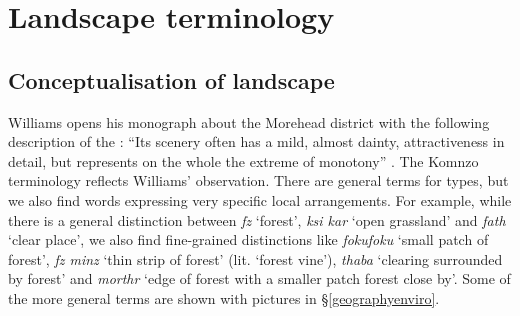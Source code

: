 \section{Landscape terminology}\label{landscapeterminology}

\subsection{Conceptualisation of landscape}\label{cncptlndscp}

Williams opens his monograph about the Morehead district with the following description of the : ``Its scenery often has a mild, almost dainty, attractiveness in detail, but represents on the whole the extreme of monotony'' {\citeyear[1]{Williams:1936transfly}}. The Komnzo terminology reflects Williams' observation. There are general terms for  types, but we also find words expressing very specific local arrangements. For example, while there is a general distinction between \emph{fz} `forest', \emph{ksi kar} `open grassland' and \emph{fath} `clear place', we also find fine-grained distinctions like \emph{fokufoku} `small patch of forest', \emph{fz minz} `thin strip of forest' (lit. `forest vine'), \emph{thaba} `clearing surrounded by forest' and \emph{morthr} `edge of forest with a smaller patch forest close by'. Some of the more general terms are shown with pictures in {\S}\ref{geographyenviro}.

